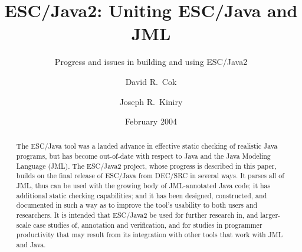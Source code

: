 \documentclass{llncs}
\newif\ifpdf
\begin{document}
\topmargin=-1cm

\title{ESC/Java2: Uniting ESC/Java and JML}
\subtitle{Progress and issues in building and using ESC/Java2}

\author{David R.~Cok \and Joseph R.~Kiniry}

\date{February 2004}

\maketitle

\newcommand{\myhref}[2]{\ifpdf\href{#1}{#2}\else\htmladdnormallinkfoot{#2}{#1}\fi}

\begin{abstract}
  The ESC/Java tool was a lauded advance in effective static checking
  of realistic Java programs, but has become out-of-date with respect
  to Java and the Java Modeling Language (JML).  The ESC/Java2
  project, whose progress is described in this paper, builds on the
  final release of ESC/Java from DEC/SRC in several ways.  It parses
  all of JML, thus can be used with the growing body of JML-annotated
  Java code; it has additional static checking capabilities; and it
  has been designed, constructed, and documented in such a way as to
  improve the tool's usability to both users and researchers.  It is
  intended that ESC/Java2 be used for further research in, and
  larger-scale case studies of, annotation and verification, and for
  studies in programmer productivity that may result from its
  integration with other tools that work with JML and Java.
\end{abstract}

\end{document}

